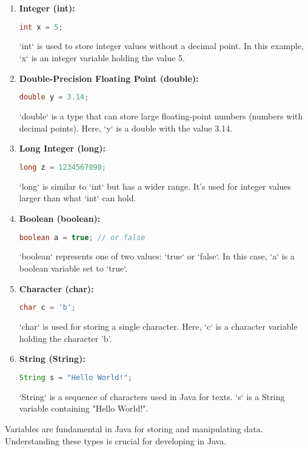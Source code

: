 \documentclass{article}
\begin{document}
\begin{enumerate}
  \item \textbf{Integer (int):}
  \begin{lstlisting}[language=Java]
int x = 5;
  \end{lstlisting}
  `int` is used to store integer values without a decimal point. In this example, `x` is an integer variable holding the value 5.

  \item \textbf{Double-Precision Floating Point (double):}
  \begin{lstlisting}[language=Java]
double y = 3.14;
  \end{lstlisting}
  `double` is a type that can store large floating-point numbers (numbers with decimal points). Here, `y` is a double with the value 3.14.

  \item \textbf{Long Integer (long):}
  \begin{lstlisting}[language=Java]
long z = 1234567890;
  \end{lstlisting}
  `long` is similar to `int` but has a wider range. It's used for integer values larger than what `int` can hold.

  \item \textbf{Boolean (boolean):}
  \begin{lstlisting}[language=Java]
boolean a = true; // or false
  \end{lstlisting}
  `boolean` represents one of two values: `true` or `false`. In this case, `a` is a boolean variable set to `true`.

  \newpage
  \item \textbf{Character (char):}
  \begin{lstlisting}[language=Java]
char c = 'b';
  \end{lstlisting}
  `char` is used for storing a single character. Here, `c` is a character variable holding the character 'b'.

  \item \textbf{String (String):}
  \begin{lstlisting}[language=Java]
String s = "Hello World!";
  \end{lstlisting}
  `String` is a sequence of characters used in Java for texts. `s` is a String variable containing "Hello World!".
\end{enumerate}

\begin{text}

Variables are fundamental in Java for storing and manipulating data. Understanding these types is crucial for developing in Java.

\end{text}
\end{document}
